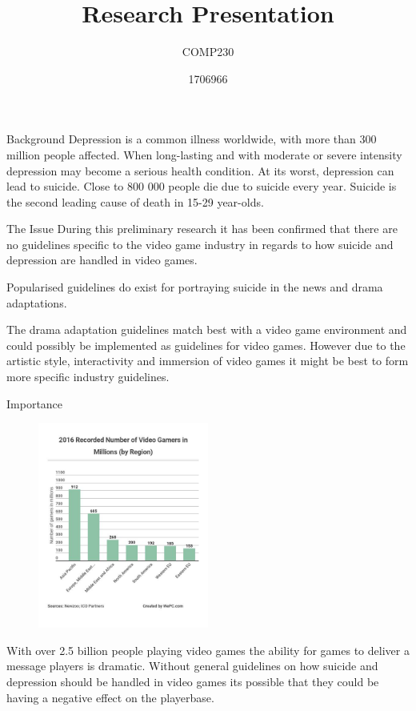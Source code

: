 \documentclass{beamer}
\title{Research Presentation}
\subtitle{COMP230}
\author{1706966}
\begin{document}
\begin{frame}
	\maketitle
\end{frame}

\begin{frame}{Background}
	Depression is a common illness worldwide, with more than 300 million people affected. When long-lasting and with moderate or severe intensity depression may become a serious health condition. At its worst, depression can lead to suicide. Close to 800 000 people die due to suicide every year. Suicide is the second leading cause of death in 15-29 year-olds\cite{DepressionStats}.
\end{frame}

\begin{frame}{The Issue}
	During this preliminary research it has been confirmed that there are no guidelines specific to the video game industry in regards to how suicide and depression are handled in video games.\vspace{5mm} %
	
	Popularised guidelines do exist for portraying suicide in the news\cite{world2017preventing}\cite{nepon2009media} and drama adaptations\cite{DramaGuidelines}. \vspace{5mm} %
	
	The drama adaptation guidelines match best with a video game environment and could possibly be implemented as guidelines for video games. However due to the artistic style, interactivity and immersion of video games it might be best to form more specific industry guidelines.   
\end{frame}

\begin{frame}{Importance}
	\begin{figure} %
		\centering
		\includegraphics[width=0.5\textwidth]{numberOfGamers}
	\end{figure}
	With over 2.5 billion people playing video games the ability for games to deliver a message players is dramatic. Without general guidelines on how suicide and depression should be handled in video games its possible that they could be having a negative effect on the playerbase.
\end{frame}
\end{document}
